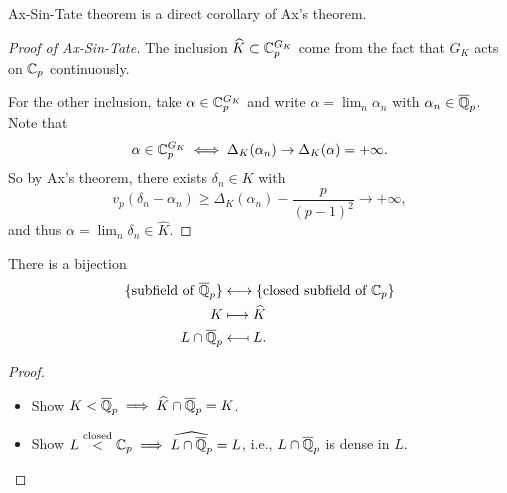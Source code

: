 Ax-Sin-Tate theorem is a direct corollary of Ax's theorem.
\begin{proof}
    [Proof of Ax-Sin-Tate]
    The inclusion $\widehat{K}\subset \mathbb{C}_p^{G_K}$ come from the fact that $G_K$ acts on $\mathbb{C}_p$ continuously.

    For the other inclusion, take $\alpha\in \mathbb{C}_p^{G_K}$ and write $\alpha = \lim_{n}\alpha_n$ with $\alpha_n\in\overline{\mathbb{Q}}_p$.
    Note that \[\alpha\in\mathbb{C}_p^{G_K}\iff \Delta_K(\alpha_n)\to \Delta_K(\alpha) = +\infty.\]
    So by Ax's theorem,
    there exists $\delta_n\in K$ with \[v_p(\delta_n - \alpha_n)\ge \Delta_K(\alpha_n) - \frac{p}{(p-1)^2}\to+\infty,\]
    and thus $\alpha = \lim_n\delta_n\in\widehat{K}$.
\end{proof}

\begin{theorem}
    There is a bijection
    \begin{align*}
        \{\text{subfield of }\overline{\mathbb{Q}}_p\}&\longleftrightarrow
        \{\text{closed subfield of }\mathbb{C}_p\}\\
        K&\longmapsto \widehat{K}\\ 
        L\cap\overline{\mathbb{Q}}_p&\longmapsfrom L.
    \end{align*}
\end{theorem}
\begin{proof}
    \begin{itemize}
\item Show $K < \overline{\mathbb{Q}}_p\implies \widehat{K}\cap\overline{\mathbb{Q}}_p = K$.
\item Show $L\stackrel{\text{closed}}{<}\mathbb{C}_p\implies \widehat{L\cap\overline{\mathbb{Q}}_p} = L$, i.e.,
$L\cap\overline{\mathbb{Q}}_p$ is dense in $L$.
    \end{itemize}
\end{proof}














